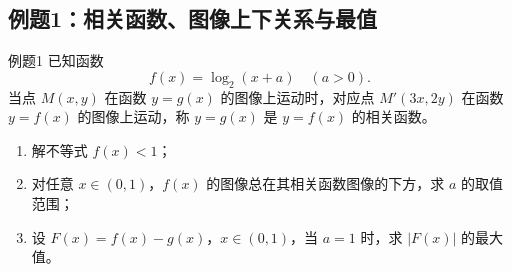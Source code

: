 \documentclass[11pt,a4paper]{ctexart}
\begin{document}
\subsection{例题1：相关函数、图像上下关系与最值}

\begin{exbox}{例题1}
已知函数
\[
f(x)=\log_2(x+a)\quad (a>0).
\]
当点 $M(x,y)$ 在函数 $y=g(x)$ 的图像上运动时，对应点 $M'(3x,2y)$ 在函数 $y=f(x)$ 的图像上运动，称 $y=g(x)$ 是 $y=f(x)$ 的相关函数。
\begin{enumerate}[label=(\arabic*)]
  \item 解不等式 $f(x)<1$；
  \item 对任意 $x\in(0,1)$，$f(x)$ 的图像总在其相关函数图像的下方，求 $a$ 的取值范围；
  \item 设 $F(x)=f(x)-g(x)$，$x\in(0,1)$，当 $a=1$ 时，求 $|F(x)|$ 的最大值。
\end{enumerate}
\end{exbox}
\end{document}
